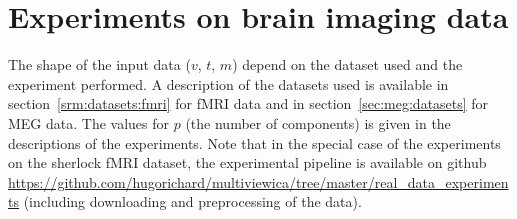 \section{Experiments on brain imaging data}
The shape of the input data ($v$, $t$, $m$) depend on the dataset used and the experiment
  performed. A description of the datasets used is available in section~\ref{srm:datasets:fmri}
  for fMRI data and in section~\ref{sec:meg:datasets} for MEG data. The values for $p$ (the
  number of components) is given in the descriptions of the experiments. 
  Note that in the special case of the experiments on the sherlock fMRI dataset, the
  experimental pipeline is available on github \url{https://github.com/hugorichard/multiviewica/tree/master/real_data_experiments} (including downloading and
  preprocessing of the data).

